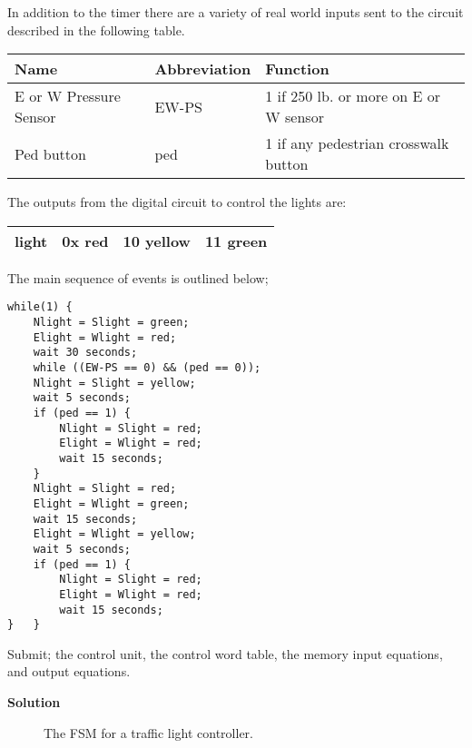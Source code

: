 \begin{enumerate}
        In addition to the timer there are a variety of real world inputs
        sent to the circuit described in the following table.

        \begin{tabular}{|l|l|l|} \hline
            Name                    & Abbreviation & Function \\                       \hline \hline
            E or W Pressure Sensor  & EW-PS & 1 if 250 lb. or more on E or W sensor \\ \hline
            Ped button              & ped   & 1 if any pedestrian crosswalk button  \\ \hline
        \end{tabular}

        The outputs from the digital circuit to control the lights are:

        \begin{tabular}{|l|l|l|l|} \hline
            light           & 0x red &  10 yellow & 11 green \\ \hline
        \end{tabular}

        The main sequence of events is outlined below;
\begin{verbatim}
while(1) {
    Nlight = Slight = green;
    Elight = Wlight = red;
    wait 30 seconds;
    while ((EW-PS == 0) && (ped == 0));
    Nlight = Slight = yellow;
    wait 5 seconds;
    if (ped == 1) {
        Nlight = Slight = red;
        Elight = Wlight = red;
        wait 15 seconds;
    }
    Nlight = Slight = red;
    Elight = Wlight = green;
    wait 15 seconds;
    Elight = Wlight = yellow;
    wait 5 seconds;
    if (ped == 1) {
        Nlight = Slight = red;
        Elight = Wlight = red;
        wait 15 seconds;
}   }
\end{verbatim}

        Submit;
        the control unit,
        the control word table,
        the memory input equations, and
        output equations.

        \begin{onlysolution}  \textbf{Solution} \itshape{

                \begin{figure}[ht]
                    \caption{The FSM for a traffic light controller.}
                \end{figure}

}
\end{onlysolution}
\end{enumerate}
